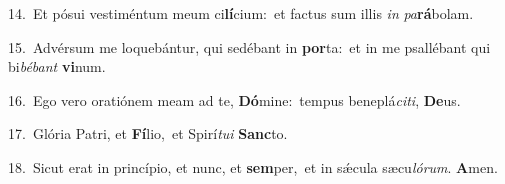 {\numbfont\textcolor{\numbcolor}{14.}}~Et pósui vestiméntum meum ci\-\textbf{lí}\-cium:~\star et factus sum illis \textit{in} \textit{pa}\-\textbf{rá}bolam.\par
{\numbfont\textcolor{\numbcolor}{15.}}~Advérsum me loquebántur, qui sedébant in \textbf{por}\-ta:~\star et in me psallébant qui bi\-\textit{bé}\-\textit{bant} \textbf{vi}\-num.\par
{\numbfont\textcolor{\numbcolor}{16.}}~Ego vero oratiónem meam ad te, \textbf{Dó}\-mine:~\star tempus beneplá\-\textit{ci}\-\textit{ti}, \textbf{De}\-us.\par
{\numbfont\textcolor{\numbcolor}{17.}}~Glória Patri, et \textbf{Fí}\-lio,~\star et Spirí\-\textit{tu}\-\textit{i} \textbf{Sanc}\-to.\par
{\numbfont\textcolor{\numbcolor}{18.}}~Sicut erat in princípio, et nunc, et \textbf{sem}\-per,~\star et in sǽcula sæcu\-\textit{ló}\-\textit{rum}. \textbf{A}\-men.\par
